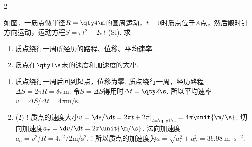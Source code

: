\begin{paracol}{2}
\begin{problem}
    如图，一质点做半径$R=\qty4\m$的圆周运动，$t=0$时质点位于$A$点，然后顺时针方向运动，运动方程$S=\pi t^2+2\pi t$ (SI). 求
    \begin{enumerate}
        \item 质点绕行一周所经历的路程、位移、平均速率.
        \item 质点在$\qty1\s$末的速度和加速度的大小.
    \end{enumerate}
    \switchcolumn\vspace*{\fill}\centering
    \vspace*{\fill}
\end{problem}
\end{paracol}
\begin{solution}\leavevmode
    \begin{enumerate}
        \item 质点绕行一周后回到起点，位移为零. 质点绕行一周，经历路程$\Delta S=2\pi R=8\pi\unit\m$. 令$S=\Delta S$得用时$\Delta t=\qty2\s$. 所以平均速率$\overline{v}=\Delta S/\Delta t=4\pi\unit{\m/\s}$.
        \item
        \begin{tasks}[label=\labelitemii](2)
            \task! 质点的速度大小$v=\d s/\d t=2\pi t+2\pi\big|_{t=\qty1\s}=4\pi\unit{\m/\s}$.
            \task 切向加速度$a_\tau=\d v/\d t=2\pi\unit{\m/\s}$.
            \task 法向加速度$a_n=v^2/R=4\pi^2/2\unit{\m/\s^2}$.
            \task! 所以质点的加速度为$a=\sqrt{a_{\tau}^2+a_n^2}=\qty{39.98}{\m\cdot\s^{-2}}$.
        \end{tasks}
    \end{enumerate}
\end{solution}

